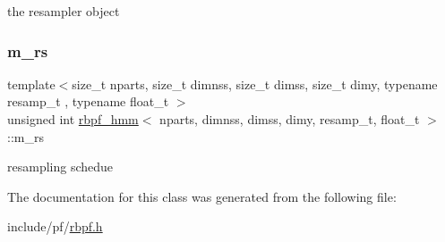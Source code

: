 the resampler object \mbox{\label{classrbpf__hmm_ae4f15e5a4f31eefa789fbffd86e78a6b}} 
\subsubsection{\texorpdfstring{m\+\_\+rs}{m\_rs}}
{\footnotesize\ttfamily template$<$size\+\_\+t nparts, size\+\_\+t dimnss, size\+\_\+t dimss, size\+\_\+t dimy, typename resamp\+\_\+t , typename float\+\_\+t $>$ \\
unsigned int \hyperlink{classrbpf__hmm}{rbpf\+\_\+hmm}$<$ nparts, dimnss, dimss, dimy, resamp\+\_\+t, float\+\_\+t $>$\+::m\+\_\+rs\hspace{0.3cm}{\ttfamily [private]}}

resampling schedue 

The documentation for this class was generated from the following file\+:\begin{DoxyCompactItemize}
\item 
include/pf/\hyperlink{rbpf_8h}{rbpf.\+h}\end{DoxyCompactItemize}
